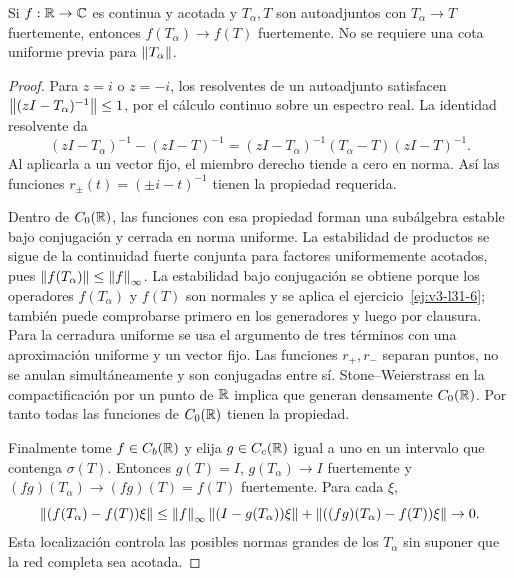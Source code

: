 \begin{teorema}\label{v3:funcion-acotada-sot}
Si $f:\mathbb R\to\mathbb C$ es continua y acotada y $T_\alpha,T$ son autoadjuntos con $T_\alpha\to T$ fuertemente, entonces $f(T_\alpha)\to f(T)$ fuertemente. No se requiere una cota uniforme previa para $\left\lVert T_\alpha\right\rVert$.
\end{teorema}
\begin{proof}
Para $z=i$ o $z=-i$, los resolventes de un autoadjunto satisfacen $\left\lVert(zI-T_\alpha)^{-1}\right\rVert\le1$, por el cálculo continuo sobre un espectro real. La identidad resolvente da
\[
 (zI-T_\alpha)^{-1}-(zI-T)^{-1}
 =(zI-T_\alpha)^{-1}(T_\alpha-T)(zI-T)^{-1}.
\]
Al aplicarla a un vector fijo, el miembro derecho tiende a cero en norma. Así las funciones $r_\pm(t)=(\pm i-t)^{-1}$ tienen la propiedad requerida.

Dentro de $C_0(\mathbb R)$, las funciones con esa propiedad forman una subálgebra estable bajo conjugación y cerrada en norma uniforme. La estabilidad de productos se sigue de la continuidad fuerte conjunta para factores uniformemente acotados, pues $\left\lVert f(T_\alpha)\right\rVert\le\left\lVert f\right\rVert_\infty$. La estabilidad bajo conjugación se obtiene porque los operadores $f(T_\alpha)$ y $f(T)$ son normales y se aplica el ejercicio~\ref{ej:v3-l31-6}; también puede comprobarse primero en los generadores y luego por clausura. Para la cerradura uniforme se usa el argumento de tres términos con una aproximación uniforme y un vector fijo. Las funciones $r_+,r_-$ separan puntos, no se anulan simultáneamente y son conjugadas entre sí. Stone--Weierstrass en la compactificación por un punto de $\mathbb R$ implica que generan densamente $C_0(\mathbb R)$. Por tanto todas las funciones de $C_0(\mathbb R)$ tienen la propiedad.

Finalmente tome $f\in C_b(\mathbb R)$ y elija $g\in C_c(\mathbb R)$ igual a uno en un intervalo que contenga $\sigma(T)$. Entonces $g(T)=I$, $g(T_\alpha)\to I$ fuertemente y $(fg)(T_\alpha)\to(fg)(T)=f(T)$ fuertemente. Para cada $\xi$,
\[
 \left\lVert(f(T_\alpha)-f(T))\xi\right\rVert
 \le\left\lVert f\right\rVert_\infty\left\lVert(I-g(T_\alpha))\xi\right\rVert
 +\left\lVert((fg)(T_\alpha)-f(T))\xi\right\rVert\to0.
\]
Esta localización controla las posibles normas grandes de los $T_\alpha$ sin suponer que la red completa sea acotada.
\end{proof}

